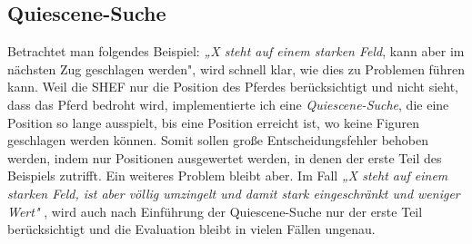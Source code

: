 \documentclass[
  manuscript=article,  %
  layout=publish,  %
  year=2023,
  volume=1,
]{extra/joas}
\begin{document}
\subsection{Quiescene-Suche}
Betrachtet man folgendes Beispiel: \textit{„X steht auf einem starken Feld}, kann aber im nächsten Zug geschlagen werden", wird schnell klar, wie dies zu Problemen führen kann. Weil die SHEF nur die Position des Pferdes berücksichtigt und nicht sieht, dass das Pferd bedroht wird, implementierte ich eine \textit{Quiescene-Suche}, die eine Position so lange ausspielt, bis eine Position erreicht ist, wo keine Figuren geschlagen werden können. Somit sollen große Entscheidungsfehler behoben werden, indem nur Positionen ausgewertet werden, in denen der erste Teil des Beispiels zutrifft.
Ein weiteres Problem bleibt aber. Im Fall \textit{„X steht auf einem starken Feld, ist aber völlig umzingelt und damit stark eingeschränkt und weniger Wert"} , wird auch nach Einführung der Quiescene-Suche nur der erste Teil berücksichtigt und die Evaluation bleibt in vielen Fällen ungenau.
\end{document}
